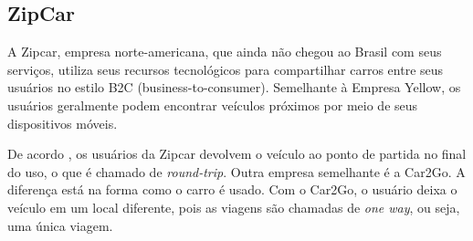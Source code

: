 \subsection{ZipCar}

A Zipcar, empresa norte-americana, que ainda não chegou ao Brasil com seus serviços, utiliza seus recursos tecnológicos para compartilhar carros entre seus usuários no estilo B2C (business-to-consumer). Semelhante à Empresa Yellow, os usuários geralmente podem encontrar veículos próximos por meio de seus dispositivos móveis.

De acordo \cite{ballus-armet}, os usuários da Zipcar devolvem o veículo ao ponto de partida no final do uso, o que é chamado de \textit{round-trip}. Outra empresa semelhante é a Car2Go. A diferença está na forma como o carro é usado. Com o Car2Go, o usuário deixa o veículo em um local diferente, pois as viagens são chamadas de \textit{one way}, ou seja, uma única viagem.

